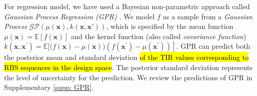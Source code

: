 For regression model, we have used a Bayesian non-parametric approach called \textit{Gaussian Process Regression (GPR)} \cite{Rasmussen2004,srinivas2012information, romero_navigating_2013}.
We model $f$ as a sample from a \textit{Gaussian Process} $\mathcal{G} \mathcal{P}(\mu(\mathbf{x}), k(\mathbf{x}, \mathbf{x'}))$, which is specified by the mean function $\mu(\mathbf{x})=\mathbb{E}[f(\mathbf{x})]$ and the kernel function (also called \textit{covariance function}) $k\left(\mathbf{x}, \mathbf{x}^{\prime}\right)=\mathbb{E}[(f(\mathbf{x})-\left.\mu(\mathbf{x}))\left(f\left(\mathbf{x}^{\prime}\right)-\mu\left(\mathbf{x}^{\prime}\right)\right)\right]$.
GPR can predict both the posterior mean and standard deviation \hl{of the TIR values corresponding to RBS sequences in the design space}. The posterior standard deviation represents the level of uncertainty for the prediction.
We review the predictions of GPR in Supplementary \ref{supp: GPR}.\\


